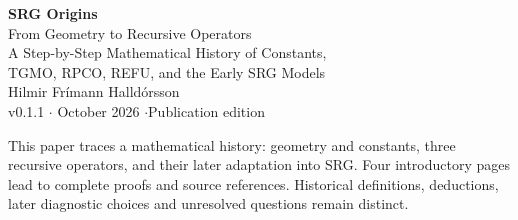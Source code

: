 \documentclass[11pt,a4paper]{article}
\begin{document}
\begin{center}
{\color{ink}\LARGE\bfseries SRG Origins}\\[6pt]
{\Large From Geometry to Recursive Operators}\\[8pt]
{\small A Step-by-Step Mathematical History of Constants,\\
TGMO, RPCO, REFU, and the Early SRG Models}\\[10pt]
{\normalsize Hilmir Frímann Halldórsson}\\[3pt]
{\small v0.1.1 \enspace$\cdot$ October 2026 \enspace$\cdot$\enspace Publication edition}
\end{center}
\vspace{3pt}
\noindent This paper traces a mathematical history: geometry and constants, three
recursive operators, and their later adaptation into SRG. Four introductory pages
lead to complete proofs and source references. Historical definitions, deductions,
later diagnostic choices and unresolved questions remain distinct.
\end{document}
